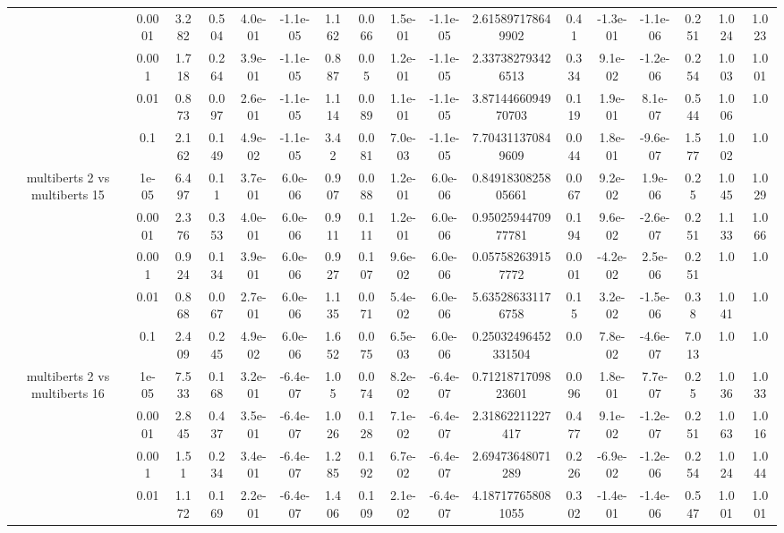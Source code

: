 \begin{tabular}{|c|c|c|c|c|c|c|c|c|c|c|c|c|c|c|c|c|}
 & 0.0001 & 3.282 & 0.504 & 4.0e-01 & -1.1e-05 & 1.162 & 0.066 & 1.5e-01 & -1.1e-05 & 2.615897178649902 & 0.41 & -1.3e-01 & -1.1e-06 & 0.251 & 1.024 & 1.023 \\
 & 0.001 & 1.718 & 0.264 & 3.9e-01 & -1.1e-05 & 0.887 & 0.05 & 1.2e-01 & -1.1e-05 & 2.337382793426513 & 0.334 & 9.1e-02 & -1.2e-06 & 0.254 & 1.003 & 1.001 \\
 & 0.01 & 0.873 & 0.097 & 2.6e-01 & -1.1e-05 & 1.114 & 0.089 & 1.1e-01 & -1.1e-05 & 3.8714466094970703 & 0.119 & 1.9e-01 & 8.1e-07 & 0.544 & 1.006 & 1.0 \\
 & 0.1 & 2.162 & 0.149 & 4.9e-02 & -1.1e-05 & 3.42 & 0.081 & 7.0e-03 & -1.1e-05 & 7.704311370849609 & 0.044 & 1.8e-01 & -9.6e-07 & 1.577 & 1.002 & 1.0 \\
\hline
\multirow{5}{*}{multiberts 2 vs multiberts 15} & 1e-05 & 6.497 & 0.11 & 3.7e-01 & 6.0e-06 & 0.907 & 0.088 & 1.2e-01 & 6.0e-06 & 0.8491830825805661 & 0.067 & 9.2e-02 & 1.9e-06 & 0.25 & 1.045 & 1.029 \\
 & 0.0001 & 2.376 & 0.353 & 4.0e-01 & 6.0e-06 & 0.911 & 0.111 & 1.2e-01 & 6.0e-06 & 0.9502594470977781 & 0.194 & 9.6e-02 & -2.6e-07 & 0.251 & 1.133 & 1.066 \\
 & 0.001 & 0.924 & 0.134 & 3.9e-01 & 6.0e-06 & 0.927 & 0.107 & 9.6e-02 & 6.0e-06 & 0.057582639157772 & 0.001 & -4.2e-02 & 2.5e-06 & 0.251 & 1.0 & 1.0 \\
 & 0.01 & 0.868 & 0.067 & 2.7e-01 & 6.0e-06 & 1.135 & 0.071 & 5.4e-02 & 6.0e-06 & 5.635286331176758 & 0.15 & 3.2e-02 & -1.5e-06 & 0.38 & 1.041 & 1.0 \\
 & 0.1 & 2.409 & 0.245 & 4.9e-02 & 6.0e-06 & 1.652 & 0.075 & 6.5e-03 & 6.0e-06 & 0.25032496452331504 & 0.0 & 7.8e-02 & -4.6e-07 & 7.013 & 1.0 & 1.0 \\
\hline
\multirow{5}{*}{multiberts 2 vs multiberts 16} & 1e-05 & 7.533 & 0.168 & 3.2e-01 & -6.4e-07 & 1.05 & 0.074 & 8.2e-02 & -6.4e-07 & 0.7121871709823601 & 0.096 & 1.8e-01 & 7.7e-07 & 0.25 & 1.036 & 1.033 \\
 & 0.0001 & 2.845 & 0.437 & 3.5e-01 & -6.4e-07 & 1.026 & 0.128 & 7.1e-02 & -6.4e-07 & 2.31862211227417 & 0.477 & 9.1e-02 & -1.2e-07 & 0.251 & 1.063 & 1.016 \\
 & 0.001 & 1.51 & 0.234 & 3.4e-01 & -6.4e-07 & 1.285 & 0.192 & 6.7e-02 & -6.4e-07 & 2.69473648071289 & 0.226 & -6.9e-02 & -1.2e-06 & 0.254 & 1.024 & 1.044 \\
 & 0.01 & 1.172 & 0.169 & 2.2e-01 & -6.4e-07 & 1.406 & 0.109 & 2.1e-02 & -6.4e-07 & 4.187177658081055 & 0.302 & -1.4e-01 & -1.4e-06 & 0.547 & 1.001 & 1.001 \\

\end{tabular}
